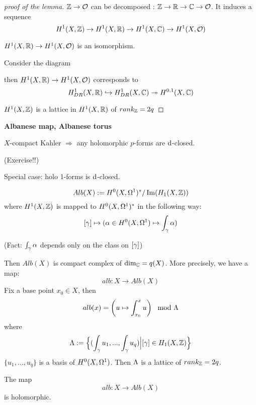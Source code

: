 \begin{proof}[proof of the lemma]

$\mathbb{Z}\to\mathcal{O}$ can be decomposed : $\mathbb{Z}\to\mathbb{R}\to\mathbb{C}\to\mathcal{O}$.
It induces a sequence
$$H^1(X,\mathbb{Z})\to H^1(X,\mathbb{R})\to H^1(X,\mathbb{C})\to H^1(X,\mathcal{O})$$

$H^1(X,\mathbb{R})\to H^1(X,\mathcal{O})$ is an isomorphism.

Consider the diagram

then $H^1(X,\mathbb{R})\to H^1(X,\mathcal{O})$ corresponds to
$$
  H^1_{DR}(X,\mathbb{R})\hookrightarrow H^1_{DR}(X,\mathbb{C})\twoheadrightarrow H^{0,1}(X,\mathbb{C})
$$

$H^1(X,\mathbb{Z})$ is a lattice in $H^1(X,\mathbb{R})$ of $rank_{\mathbb{Z}}=2q$
\end{proof}

\textbf{Albanese map, Albanese torus}

$X$-compact Kahler $\Rightarrow$ any holomorphic $p$-forms are $\mathrm{d}$-closed.

(Exercise!!)

Special case: holo 1-forms is $\mathrm{d}$-closed.

$$Alb(X):=H^0(X,\Omega^1)^*/\operatorname{Im}(H_1(X,\mathbb{Z}))$$
where $H^1(X,\mathbb{Z})$ is mapped to
$H^0(X,\Omega^1)^*$ in the following way:
$$[\gamma]\mapsto(\alpha\in H^0(X,\Omega^1)\mapsto\int_\gamma\alpha)$$

(Fact: $\int_\gamma\alpha$ depends only on the class on $[\gamma]$)

Then $Alb(X)$ is compact complex of $\dim_{\mathbb{C}}=q(X)$.
More precisely, we have a map:
$$alb: X\to Alb(X)$$
Fix a base point $x_0\in X$, then
$$alb(x)=
\left(
  u\mapsto
  \int_{x_0}^x u
\right)\mod{\Lambda}
$$
where
$$\Lambda:=\Big\{ (\int_\gamma u_1,...,\int_\gamma u_q) \Big| [\gamma]\in H_1(X,\mathbb{Z}) \Big\}$$
$\{u_1,...,u_q\}$ is a basis of $H^0(X,\Omega^1)$.
Then $\Lambda$ is a lattice of $rank_{\mathbb{Z}}=2q$.

The map
$$alb: X\to Alb(X)$$
is holomorphic.








